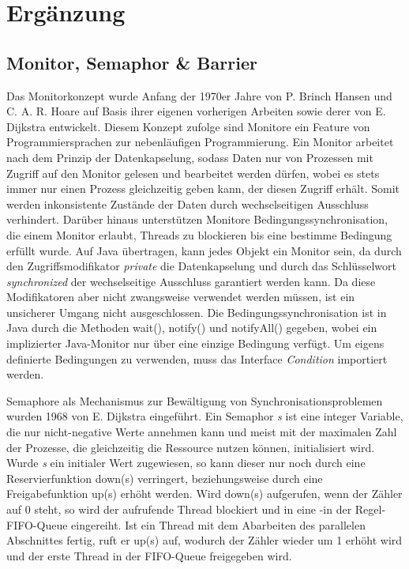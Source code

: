 \documentclass[12pt, onecolumn,notitlepage]{scrartcl}
\begin{document}
\section{Ergänzung}
\subsection{Monitor, Semaphor \& Barrier}
Das Monitorkonzept wurde Anfang der 1970er Jahre von P. Brinch Hansen und C. A. R. Hoare auf Basis ihrer eigenen vorherigen Arbeiten sowie derer von E. Dijkstra entwickelt.\cite{hansen} Diesem Konzept zufolge sind Monitore ein Feature von Programmiersprachen zur nebenläufigen Programmierung. Ein Monitor arbeitet nach dem Prinzip der Datenkapselung, sodass Daten nur von Prozessen mit Zugriff auf den Monitor gelesen und bearbeitet werden dürfen, wobei es stets immer nur einen Prozess gleichzeitig geben kann, der diesen Zugriff erhält. Somit werden inkonsistente Zustände der Daten durch wechselseitigen Ausschluss verhindert. Darüber hinaus unterstützen Monitore Bedingungssynchronisation, die einem Monitor erlaubt, Threads zu blockieren bis eine bestimme Bedingung erfüllt wurde.\cite{magee} Auf Java übertragen, kann jedes Objekt ein Monitor sein, da durch den Zugriffsmodifikator \textit{private} die Datenkapselung und durch das Schlüsselwort \textit{synchronized} der wechselseitige Ausschluss garantiert werden kann. Da diese Modifikatoren aber nicht zwangsweise verwendet werden müssen, ist ein unsicherer Umgang nicht ausgeschlossen.\cite{joerg} Die Bedingungssynchronisation ist in Java durch die Methoden wait(), notify() und notifyAll() gegeben, wobei ein implizierter Java-Monitor nur über eine einzige Bedingung verfügt. Um eigens definierte Bedingungen zu verwenden, muss das Interface \textit{Condition} importiert werden.\cite{condition} \par
Semaphore als Mechanismus zur Bewältigung von Synchronisationsproblemen wurden 1968 von E. Dijkstra eingeführt. Ein Semaphor \textit{s} ist eine integer Variable, die nur nicht-negative Werte annehmen kann und meist mit der maximalen Zahl der Prozesse, die gleichzeitig die Ressource nutzen können, initialisiert wird. Wurde \textit{s} ein initialer Wert zugewiesen, so kann dieser nur noch durch eine Reservierfunktion down(s) verringert, beziehungsweise durch eine Freigabefunktion up(s) erhöht werden. Wird down(s) aufgerufen, wenn der Zähler auf 0 steht, so wird der aufrufende Thread blockiert und in eine -in der Regel- FIFO-Queue eingereiht. Ist ein Thread mit dem Abarbeiten des parallelen Abschnittes fertig, ruft er up(s) auf, wodurch der Zähler wieder um 1 erhöht wird und der erste Thread in der FIFO-Queue freigegeben wird.\cite{magee} \\
\end{document}
